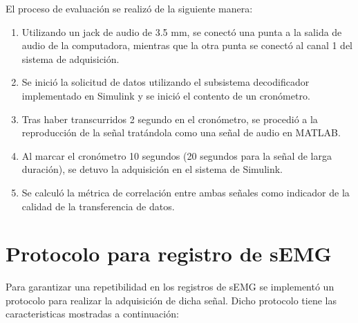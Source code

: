 \newpage
El proceso de evaluación se realizó de la siguiente manera:
\begin{enumerate}
	\item Utilizando un jack de audio de 3.5 mm, se conectó una punta a la salida de audio de la computadora, mientras que la otra punta se conectó al canal 1 del sistema de adquisición.
	\item Se inició la solicitud de datos utilizando el subsistema decodificador implementado en Simulink y se inició el contento de un cronómetro.
	\item Tras haber transcurridos 2 segundo en el cronómetro, se procedió a la reproducción de la señal tratándola como una señal de audio en MATLAB.
	\item Al marcar el cronómetro 10 segundos (20 segundos para la señal de larga duración), se detuvo la adquisición en el sistema de Simulink.
	\item Se calculó la métrica de correlación entre ambas señales como indicador de la calidad de la transferencia de datos.
\end{enumerate}


\section{Protocolo para registro de sEMG}
Para garantizar una repetibilidad en los registros de sEMG se implementó un protocolo para realizar la adquisición de dicha señal. Dicho protocolo tiene las caracteristicas mostradas a continuación:

